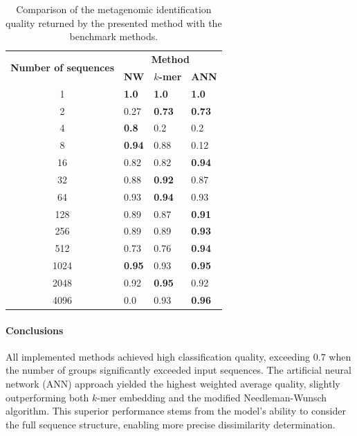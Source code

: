 \documentclass[biomedinformatics,article,submit,moreauthors]{Definitions/mdpi}
\begin{document}
                \begin{table}\centering
                    \caption{Comparison of the metagenomic identification quality returned by the presented method with the benchmark methods.}\label{Table:Experiment:Quality}

                    \begin{tabular}{|c|l|l|l|}
                        \hline
                        \multirow{2}{*}{\textbf{Number of sequences}} & \multicolumn{3}{|c|}{\textbf{Method}} \\
                        & \textbf{NW} & \textbf{$k$-mer} & \textbf{ANN} \\ \hline \hline
                        1 & \textbf{1.0} & \textbf{1.0} & \textbf{1.0}\\ \hline
                        2 & 0.27 & \textbf{0.73} & \textbf{0.73}\\ \hline
                        4 & \textbf{0.8} & 0.2 & 0.2\\ \hline
                        8 & \textbf{0.94} & 0.88 & 0.12\\ \hline
                        16 & 0.82 & 0.82 & \textbf{0.94}\\ \hline
                        32 & 0.88 & \textbf{0.92} & 0.87\\ \hline
                        64 & 0.93 & \textbf{0.94} & 0.93\\ \hline
                        128 & 0.89 & 0.87 & \textbf{0.91}\\ \hline
                        256 & 0.89 & 0.89 & \textbf{0.93}\\ \hline
                        512 & 0.73 & 0.76 & \textbf{0.94}\\ \hline
                        1024 & \textbf{0.95} & 0.93 & \textbf{0.95}\\ \hline
                        2048 & 0.92 & \textbf{0.95} & 0.92\\ \hline
                        4096 & 0.0 & 0.93 & \textbf{0.96}\\ \hline
                    \end{tabular}
                \end{table}

                \paragraph{Conclusions}
                All implemented methods achieved high classification quality, exceeding $0.7$ when the number of groups significantly exceeded input sequences. The artificial neural network (ANN) approach yielded the highest weighted average quality, slightly outperforming both $k$-mer embedding and the modified Needleman-Wunsch algorithm. This superior performance stems from the model's ability to consider the full sequence structure, enabling more precise dissimilarity determination.
\end{document}
